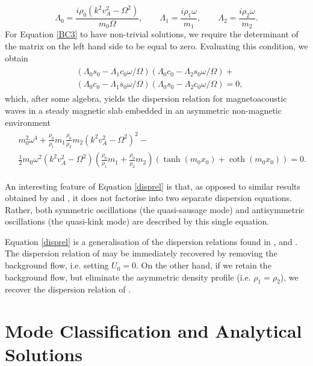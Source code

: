 \[
\Lambda_0 = \frac{i \rho_0 \left( k^2 v_A^2 - \Omega^2 \right)}{m_0 \Omega},
\qquad
\Lambda_1 = \frac{i \rho_1 \omega}{m_1},
\qquad
\Lambda_2 = \frac{i \rho_2 \omega}{m_2}.
\]
For Equation \eqref{BC3} to have non-trivial solutions, we require the determinant of the matrix on the left hand side to be equal to zero. Evaluating this condition, we obtain
\begin{align}
\begin{split}
\label{disprellambda}
& \left(\Lambda_0 s_0 - \Lambda_1 c_0 \omega/\Omega \right)
\left(\Lambda_0 c_0 - \Lambda_2 s_0 \omega/\Omega \right) +
\\
& \left(\Lambda_0 c_0 - \Lambda_1 s_0 \omega/\Omega \right)
\left( \Lambda_0 s_0 - \Lambda_2 c_0 \omega/\Omega \right) = 0,
\end{split}
\end{align}which, after some algebra, yields the dispersion relation for magnetoacoustic waves in a steady magnetic slab embedded in an asymmetric non-magnetic environment
\begin{align}
\label{disprel}
\begin{split}
& m_0^2 \omega^4 + \frac{\rho_0}{\rho_1} m_1 \frac{\rho_0}{\rho_2} m_2 ( k^2 v_A^2 - \Omega^2 )^2 - \\
& \frac{1}{2} m_0 \omega^2 ( k^2 v_A^2 - \Omega^2) \left ( \frac{\rho_0}{\rho_1} m_1 + \frac{\rho_0}{\rho_2} m_2 \right ) \left ( \tanh(m_0 x_0) + \coth(m_0 x_0) \right ) = 0.
\end{split}
\end{align}

An interesting feature of Equation \eqref{disprel} is that, as opposed to similar results obtained by \cite{Roberts1981b} and \cite{Nakariakov1995}, it does not factorise into two separate dispersion equations. Rather, both symmetric oscillations (the quasi-sausage mode) and antisymmetric oscillations (the quasi-kink mode) are described by this single equation.

Equation \eqref{disprel} is a generalisation of the dispersion relations found in \cite{Nakariakov1995}, and \cite{Allcock2017}. The dispersion relation of \cite{Allcock2017} may be immediately recovered by removing the background flow, i.e. setting $U_0 = 0$. On the other hand, if we retain the background flow, but eliminate the asymmetric density profile (i.e. $\rho_1 = \rho_2$), we recover the dispersion relation of \cite{Nakariakov1995}.

\FloatBarrier

\section{Mode Classification and Analytical Solutions}

